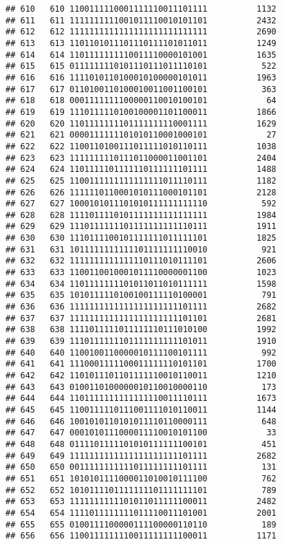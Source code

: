 \documentclass[]{article}
\begin{document}
\begin{verbatim}
## 610   610 1100111110001111110011101111          1132
## 611   611 1111111111001011110010101101          2432
## 612   612 1111111111111111111111111111          2690
## 613   613 1101101011101110111101011011          1249
## 614   614 1101111111110011110000101001          1635
## 615   615 0111111110101110111011110101           522
## 616   616 1111010110100010100000101011          1963
## 617   617 0110100110100010011001100101           363
## 618   618 0001111111100000110010100101            64
## 619   619 1110111110100100001101100011          1866
## 620   620 1101111111101111111110001111          1629
## 621   621 0000111111101010110001000101            27
## 622   622 1100110100111011111010110111          1038
## 623   623 1111111110111011000011001101          2404
## 624   624 1101111101111110111111101111          1488
## 625   625 1100111111111111111011110111          1182
## 626   626 1111110110001010111000101101          2128
## 627   627 1000101011101010111111111110           592
## 628   628 1111011110101111111111111111          1984
## 629   629 1110111111101111111111110111          1911
## 630   630 1110111100101111111011111101          1825
## 631   631 1011111111111101111111110010           921
## 632   632 1111111111111110111010111101          2606
## 633   633 1100110010001011110000001100          1023
## 634   634 1101111111101011011010111111          1598
## 635   635 1010111110100100111110100001           791
## 636   636 1111111111111111111111101111          2682
## 637   637 1111111111111111111111101101          2681
## 638   638 1111011111011111110111010100          1992
## 639   639 1110111111101111111111101011          1910
## 640   640 1100100110000010111100101111           992
## 641   641 1110001111100011111110101101          1700
## 642   642 1101011101101111110010110011          1210
## 643   643 0100110100000010110010000110           173
## 644   644 1101111111111111110011110111          1673
## 645   645 1100111110111001111010110011          1144
## 646   646 1001010110101011110110000111           648
## 647   647 0001010111000011110010101100            33
## 648   648 0111101111101010111111100101           451
## 649   649 1111111111111111111111101111          2682
## 650   650 0011111111111011111111101111           131
## 651   651 1010101111000011010010111100           762
## 652   652 1010111101111111101111111101           789
## 653   653 1111111111101011011111100011          2482
## 654   654 1111011111111011110011101001          2001
## 655   655 0100111100000111100000110110           189
## 656   656 1100111111110011111111100011          1171

\end{verbatim}
\end{document}
